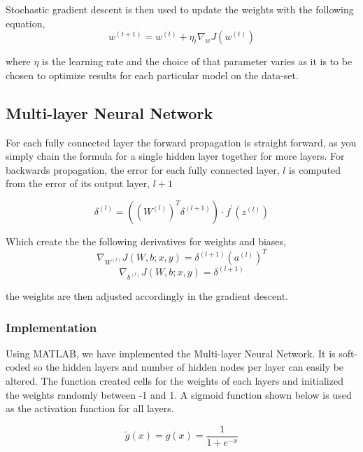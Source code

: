 \documentclass[12pt, twocolumn]{article}
\begin{document}
 Stochastic gradient descent is then used to update the weights with the following equation, 
\begin{equation}
w^{(t+1)} = w^{(t)} + \eta_t \nabla_w J(w^{(t)})
\end{equation}

where $\eta$ is  the learning rate and the choice of that parameter varies as it is to be chosen to optimize results for each particular model on the data-set.


\subsection{Multi-layer Neural Network}


For each fully connected layer the forward propagation is straight forward, as you simply  chain the formula for a single hidden layer together for more layers.  For backwards propagation, the error for each fully connected layer, $l$ is computed from the error of its output layer, $l+1$  

\begin{equation}
\delta^{(l)}=((W^{(l)})^T \delta^{(l+1)}) \cdot f ^{\prime} (z^{(l)})
\end{equation}

Which create the the following derivatives for weights and biases, 
\begin{equation}
\nabla_{W^{(l)}}J(W,b;x,y) = \delta^{(l+1)}(a^{(l)})^T
\end{equation}
\begin{equation}
\nabla_{b^{(l)}}J(W,b;x,y)= \delta^{(l+1)}
\end{equation}

the weights are then adjusted accordingly in the gradient descent.



\subsubsection{Implementation}
Using MATLAB, we have implemented the Multi-layer Neural Network. It is soft-coded so the hidden layers and number of hidden nodes per layer can easily be altered. The function created cells for the weights of each layers and initialized the weights randomly between -1 and 1.
\newline
A sigmoid function shown below is used as the activation function for all layers. 

\begin{equation}
\tilde{g}(x)= g(x) = \frac{1}{ 1+e^{-x}}
\end{equation}
\end{document}
